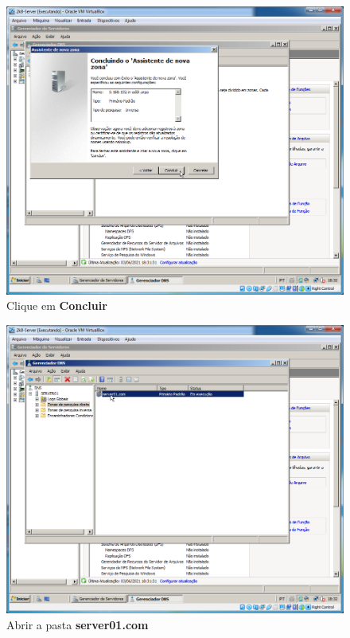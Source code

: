 \documentclass[10pt]{article}
\begin{document}
\begin{figure}[H]
    \centering
    \caption{Clique em \textbf{Concluir}}
    \label{fig:DNS027}
    \includegraphics[width=\linewidth]{images/windows_server/dns/027.png}
\end{figure}
\begin{figure}[H]
    \centering
    \caption{Abrir a pasta \textbf{server01.com}}
    \label{fig:DNS028}
    \includegraphics[width=\linewidth]{images/windows_server/dns/028.png}
\end{figure}
\end{document}
